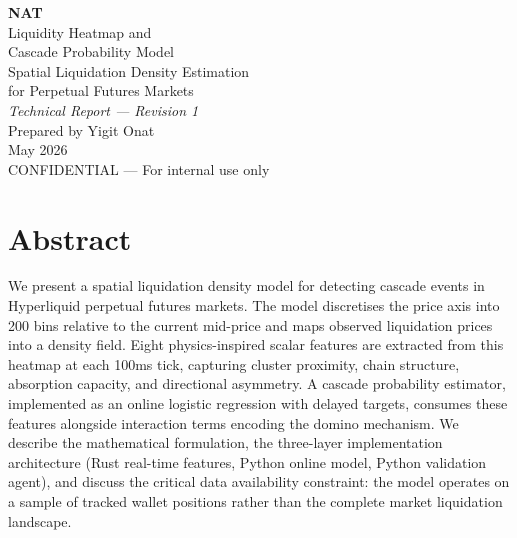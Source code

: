 \documentclass[11pt,a4paper]{article}
\begin{document}
\begin{titlepage}
\centering
\vspace*{3cm}
{\Huge\bfseries NAT\\[0.3cm]}
{\LARGE Liquidity Heatmap and\\Cascade Probability Model\\[0.5cm]}
{\Large Spatial Liquidation Density Estimation\\for Perpetual Futures Markets\\[0.3cm]}
{\large \textit{Technical Report --- Revision 1}\\[2cm]}
{\large Prepared by Yigit Onat\\[0.3cm]}
{\large May 2026\\[3cm]}
\vfill
{\small CONFIDENTIAL --- For internal use only}
\end{titlepage}

\tableofcontents
\newpage

\section*{Abstract}

We present a spatial liquidation density model for detecting cascade events in Hyperliquid perpetual futures markets. The model discretises the price axis into 200 bins relative to the current mid-price and maps observed liquidation prices into a density field. Eight physics-inspired scalar features are extracted from this heatmap at each 100ms tick, capturing cluster proximity, chain structure, absorption capacity, and directional asymmetry. A cascade probability estimator, implemented as an online logistic regression with delayed targets, consumes these features alongside interaction terms encoding the domino mechanism. We describe the mathematical formulation, the three-layer implementation architecture (Rust real-time features, Python online model, Python validation agent), and discuss the critical data availability constraint: the model operates on a sample of tracked wallet positions rather than the complete market liquidation landscape.

\newpage

\end{document}
